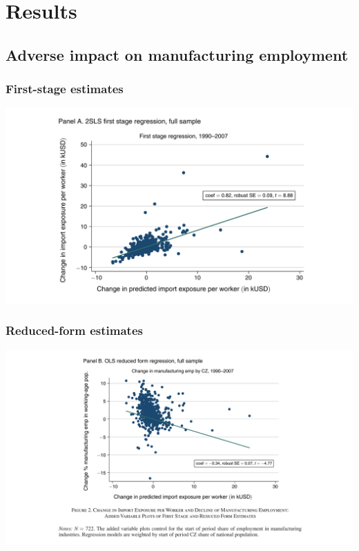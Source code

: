 \documentclass[notes=show]{beamer}
\begin{document}
\section{Results}

\subsection{Adverse impact on manufacturing employment}

\begin{frame}
\frametitle{First-stage estimates}
\begin{center}
\includegraphics[width=\textwidth]{fig-2A.pdf}%
\end{center}
\end{frame}

\begin{frame}
\frametitle{Reduced-form estimates}
\begin{center}
\includegraphics[width=\textwidth]{fig-2B.pdf}%
\end{center}
\end{frame}
\end{document}
